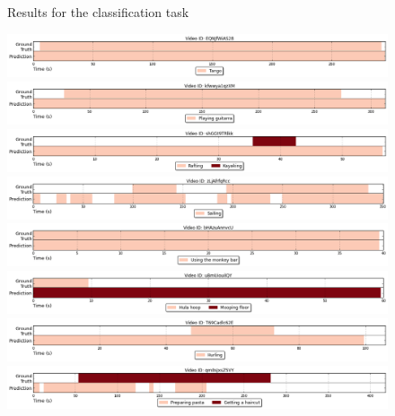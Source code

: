 \begin{figure}[H]
\caption{Results for the classification task}
\label{fig:results_visualization_classification}
\end{figure}


\begin{figure}[H]
\begin{center}
\includegraphics[width=1\linewidth]{img/results/activity_detection/activity_temporal_localization_0}
\includegraphics[width=1\linewidth]{img/results/activity_detection/activity_temporal_localization_1}
\includegraphics[width=1\linewidth]{img/results/activity_detection/activity_temporal_localization_2}
\includegraphics[width=1\linewidth]{img/results/activity_detection/activity_temporal_localization_3}
\includegraphics[width=1\linewidth]{img/results/activity_detection/activity_temporal_localization_4}
\includegraphics[width=1\linewidth]{img/results/activity_detection/activity_temporal_localization_5}
\includegraphics[width=1\linewidth]{img/results/activity_detection/activity_temporal_localization_6}
\includegraphics[width=1\linewidth]{img/results/activity_detection/activity_temporal_localization_7}

\end{center}
\end{figure}
